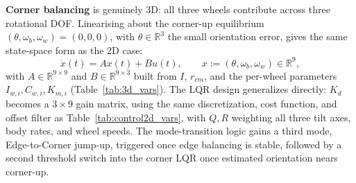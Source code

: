 \textbf{Corner balancing} is genuinely 3D: all three wheels contribute across
three rotational DOF. Linearising about the corner-up equilibrium
$(\theta,\omega_b,\omega_w)=(0,0,0)$, with $\theta\in\mathbb{R}^3$ the small
orientation error, gives the same state-space form as the 2D case:
\begin{equation}
\dot x(t) = Ax(t) + Bu(t), \qquad x := (\theta,\omega_b,\omega_w) \in \mathbb{R}^9,
\end{equation}
with $A \in \mathbb{R}^{9\times9}$ and $B \in \mathbb{R}^{9\times3}$ built
from $I$, $r_{cm}$, and the per-wheel parameters $I_{w,i}, C_{w,i}, K_{m,i}$
(Table~\ref{tab:3d_vars}). The LQR design generalizes directly: $K_d$ becomes
a $3\times9$ gain matrix, using the same discretization, cost function, and
offset filter as Table~\ref{tab:control2d_vars}, with $Q, R$ weighting all
three tilt axes, body rates, and wheel speeds. The mode-transition logic
gains a third mode, Edge-to-Corner jump-up, triggered once edge balancing is
stable, followed by a second threshold switch into the corner LQR once
estimated orientation nears corner-up.

